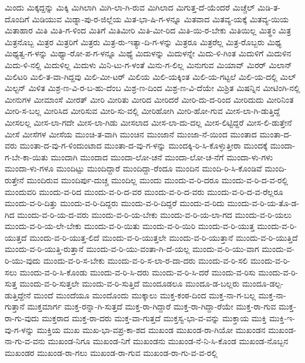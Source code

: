 {ಮಿಂದು
ಮಿಕ್ಕದ್ದನ್ನು
ಮಿಕ್ಕಿ
ಮಿಗಿಲಾಗಿ
ಮಿಗಿ-ಲಾ-ಗಿ-ರುವ
ಮಿಗಿಲಾದ
ಮಿಗುತ್ತ-ದೆ-ಯೆಂದರೆ
ಮಿಚ್ಚೆಲ್
ಮಿಡಿ-ತ-ದೊಂದಿಗೆ
ಮಿಡಿಯುವ
ಮಿಡ್ನಾ-ಪು-ರ-ಜಿಲ್ಲೆಯ
ಮಿತ-ಭಾ-ಷಿ-ಗ-ಳನ್ನೂ
ಮಿತವಾದ
ಮಿತವ್ಯ-ಯಕ್ಕೆ
ಮಿತವ್ಯ-ಯಿಯ
ಮಿತಾಹಾರ
ಮಿತಿ
ಮಿತಿ-ಗ-ಳಿಂದ
ಮಿತಿಗೆ
ಮಿತಿಮೀರಿ
ಮಿತಿ-ಮೀ-ರಿದ
ಮಿತಿ-ಯಿ-ರ-ಬೇಕು
ಮಿತಿಯಿಲ್ಲ
ಮಿತ್ಥಂ
ಮಿತ್ರ
ಮಿತ್ರನೊಬ್ಬ
ಮಿತ್ರರ
ಮಿತ್ರರಿಗೆ
ಮಿತ್ರರು
ಮಿತ್ರ-ರು-ಇತ್ಯಾ-ದಿ-ಗ-ಳನ್ನು
ಮಿತ್ರರೂ
ಮಿತ್ರರೆಲ್ಲ
ಮಿತ್ರ-ರೊಬ್ಬರು
ಮಿಥ್ಯ
ಮಿಥ್ಯತ್ವ-ಗ-ಳನ್ನು
ಮಿಥ್ಯಾ-ರೋ-ಪ-ಗ-ಳನ್ನೂ
ಮಿಥ್ಯೆ
ಮಿದುಳನ್ನು
ಮಿದುಳನ್ನೇ
ಮಿದು-ಳಿ-ಗಿಂತ
ಮಿದುಳಿಗೆ
ಮಿದುಳಿನ
ಮಿದು-ಳಿ-ನಲ್ಲಿ
ಮಿದುಳಿಲ್ಲ
ಮಿದುಳು
ಮಿನಿ-ಟು-ಗ-ಳಂತೆ
ಮಿನು-ಗ-ಲಿಲ್ಲ
ಮಿನುಗುವ
ಮಿಯಾವ್
ಮಿರರ್
ಮಿಲಾನ್
ಮಿಲಿಟರಿ
ಮಿಲಿ-ತ-ವಾ-ಗಿದ್ದವು
ಮಿಲಿ-ಮೀ-ಟರ್
ಮಿಲಿಯ
ಮಿಲಿ-ಯಕ್ಕಿಂತ
ಮಿಲಿ-ಯ-ಗಟ್ಟಲೆ
ಮಿಲಿ-ಯ-ದಲ್ಲಿ
ಮಿಲ್
ಮಿಲ್ಟನ್
ಮಿಳಿತ
ಮಿಶ್ರ-ಣ-ವಿ-ರ-ಬ-ಹು-ದೆಂಬ
ಮಿಶ್ರ-ಣ-ದಿಂದ
ಮಿಶ್ರ-ಣ-ವಿ-ದೆಯೇ
ಮಿಶ್ರಿತ
ಮಿಷನ್ನಿನ
ಮೀಟಿಂಗಿ-ನಲ್ಲಿ
ಮೀನುಗಳ
ಮೀಮಾಂಸೆ
ಮೀರತ್
ಮೀರಿ
ಮೀರಿತು
ಮೀರಿದ
ಮೀರಿದರೆ
ಮೀರಿ-ದು-ದ-ರಿಂದ
ಮೀರಿದುದು
ಮೀರಿನಿಂತ
ಮೀರಿ-ಸ-ಬಲ್ಲ
ಮೀರಿಸಿದ
ಮೀರಿಸುವ
ಮೀರಿ-ಸು-ವಲ್ಲಿ
ಮೀರಿಹೋಗಿ
ಮೀರಿ-ಹೋ-ಗುವ
ಮೀಸ-ಲಾ-ಗಿ-ಡುತ್ತಿದ್ದೆ
ಮೀಸಲಲ್ಲ
ಮೀಸ-ಲಾ-ಗದೇ
ಮೀಸ-ಲಾ-ಗಿಡು
ಮೀಸಲಾದ
ಮೀಸ-ಲಾ-ದು-ದಲ್ಲ
ಮೀಸ-ಲಿಟ್ಟಿದ್ದರೆ
ಮೀಸ-ಲಿ-ಡುತ್ತೇನೆ
ಮೀಸೆ
ಮೀಸೆಗಳ
ಮೀಸೆಯ
ಮುಂಚಿ-ತ-ವಾಗಿ
ಮುಂಚಿನ
ಮುಂಜಾನೆ
ಮುಂಜಾ-ನೆ-ಯಿಂದ
ಮುಂತಾದ
ಮುಂತಾ-ದ-ವರು
ಮುಂತಾ-ದ-ವು-ಗ-ಳಿಂದುಂಟಾದ
ಮುಂತಾ-ದ-ವು-ಗ-ಳನ್ನು
ಮುಂದಕ್ಕಿ-ರಿ-ಸಿ-ಕೊಳ್ಳುತ್ತೀರಾ
ಮುಂದಕ್ಕೆ
ಮುಂದಾ-ಗ-ಬೇ-ಕಾ-ಯಿತು
ಮುಂದಾಗಿ
ಮುಂದಾದ
ಮುಂದಾ-ಲೋ-ಚನೆ
ಮುಂದಾ-ಲೋ-ಚ-ನೆಗೆ
ಮುಂದಾ-ಳು-ಗಳು
ಮುಂದಾ-ಳು-ಗಳೂ
ಮುಂದಿಟ್ಟು
ಮುಂದಿದ್ದಾರೆ
ಮುಂದಿದ್ದಾ-ರೆಂದೂ
ಮುಂದಿನ
ಮುಂದಿ-ರಿ-ಸಿ-ಕೊಂಡಿವೆ
ಮುಂದಿ-ರುತ್ತೇನೆ
ಮುಂದಿರುವ
ಮುಂದಿರ್ಪು-ದುಚ್ಚ
ಮುಂದಿಲ್ಲ
ಮುಂದು
ಮುಂದು-ವ-ರಿ-ದರೂ
ಮುಂದು-ವ-ರಿ-ದ-ವ-ರಲ್ಲಿ
ಮುಂದುವರಿ
ಮುಂದು-ವ-ರಿದ
ಮುಂದು-ವ-ರಿ-ದ-ವರ
ಮುಂದು-ವ-ರಿ-ದ-ವರು
ಮುಂದು-ವ-ರಿ-ದ-ವ-ರೆಲ್ಲರೂ
ಮುಂದು-ವ-ರಿ-ದಿತ್ತು
ಮುಂದು-ವ-ರಿ-ದಿದ್ದರು
ಮುಂದು-ವ-ರಿ-ದಿದ್ದರೆ
ಮುಂದು-ವ-ರಿದು
ಮುಂದು-ವ-ರಿ-ಯ-ತೊ-ಡ-ಗಿದ
ಮುಂದು-ವ-ರಿ-ಯ-ದ-ವರು
ಮುಂದು-ವ-ರಿ-ಯ-ಬೇಕು
ಮುಂದು-ವ-ರಿ-ಯ-ಲಾ-ಗದ
ಮುಂದು-ವ-ರಿ-ಯಲು
ಮುಂದು-ವ-ರಿ-ಯ-ಲೇ-ಬೇಕು
ಮುಂದು-ವ-ರಿ-ಯಿತು
ಮುಂದು-ವ-ರಿ-ಯಿರಿ
ಮುಂದು-ವ-ರಿ-ಯುತ್ತ
ಮುಂದು-ವ-ರಿ-ಯುತ್ತದೆ
ಮುಂದು-ವ-ರಿ-ಯುತ್ತ-ಲಿದೆ
ಮುಂದು-ವ-ರಿ-ಯುತ್ತಲೇ
ಮುಂದು-ವ-ರಿ-ಯುತ್ತಾನೆ
ಮುಂದು-ವ-ರಿ-ಯುತ್ತಿದೆ
ಮುಂದು-ವ-ರಿ-ಯುತ್ತಿ-ರುತ್ತಾನೆ
ಮುಂದು-ವ-ರಿ-ಯು-ವಂತಾ-ಗಿ-ದೆ-ಯಲ್ಲ
ಮುಂದು-ವ-ರಿ-ಯು-ವಾಗ
ಮುಂದು-ವ-ರಿ-ಯು-ವುದು
ಮುಂದು-ವ-ರಿ-ಸ-ಬೇಕು
ಮುಂದು-ವ-ರಿ-ಸ-ಲಾ-ರ-ದಾ-ದರು
ಮುಂದು-ವ-ರಿ-ಸಲಿ
ಮುಂದು-ವ-ರಿ-ಸಲು
ಮುಂದು-ವ-ರಿ-ಸಿ-ಕೊಂಡು
ಮುಂದು-ವ-ರಿ-ಸಿ-ದರು
ಮುಂದು-ವ-ರಿ-ಸಿ-ದರೆ
ಮುಂದು-ವ-ರಿಸು
ಮುಂದು-ವ-ರಿ-ಸುತ್ತ
ಮುಂದು-ವ-ರಿ-ಸುತ್ತಲೇ
ಮುಂದು-ವ-ರಿ-ಸುತ್ತಿದೆ
ಮುಂದೂಡಲೂ
ಮುಂದೂ-ಡ-ಬಲ್ಲರು
ಮುಂದೂ-ಡಲ್ಪ-ಡುತ್ತಿದ್ದೇನೆ
ಮುಂದೆ
ಮುಂದೆಯೂ
ಮುಂದೊಂದು
ಮುಕ್ಕಾಲು
ಮುಕ್ತ-ಕಂಠ-ದಿಂದ
ಮುಕ್ತ-ನಾ-ಗ-ಬಲ್ಲ
ಮುಕ್ತ-ನಾ-ಗುತ್ತಾನೆ
ಮುಕ್ತಮಾರ್ಗ
ಮುಕ್ತ-ರನ್ನಾ-ಗಿ-ಸುತ್ತದೆ
ಮುಕ್ತ-ರಾ-ಗಿದ್ದಾರೆ
ಮುಕ್ತ-ರಾ-ಗಿದ್ದಾ-ರೆಯೇ
ಮುಕ್ತ-ರಾ-ಗುವ
ಮುಕ್ತ-ರಾ-ಗು-ವುದು
ಮುಕ್ತರಾದ
ಮುಕ್ತ-ರಾ-ದರು
ಮುಕ್ತ-ವಾ-ಗುತ್ತದೆ
ಮುಕ್ತಸ್ವ-ಭಾ-ವ-ವನ್ನು
ಮುಕ್ತಾಯ
ಮುಕ್ತಿ
ಮುಕ್ತಿ-ಇ-ವು-ಗ-ಳನ್ನು
ಮುಕ್ತಿಯ
ಮುಖ
ಮುಖ-ಭಾ-ವಪ್ರ-ಕಾ-ಶದ
ಮುಖಂಡ
ಮುಖಂಡ-ರಾ-ಗಿಯೋ
ಮುಖಂಡನ
ಮುಖಂಡ-ನಾ-ಗು-ವ-ವನು
ಮುಖಂಡ-ನಿಗೂ
ಮುಖಂಡ-ನಿಗೆ
ಮುಖಂಡನು
ಮುಖಂಡ-ನೆ-ನಿ-ಸಿ-ಕೊಂಡ
ಮುಖಂಡ-ನೊಬ್ಬನ
ಮುಖಂಡರ
ಮುಖಂಡ-ರಾ-ಗಲು
ಮುಖಂಡ-ರಾ-ಗುವ
ಮುಖಂಡ-ರಾ-ಗು-ವ-ವ-ರಲ್ಲಿ
}
